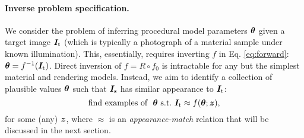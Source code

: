 \paragraph{Inverse problem specification.}
We consider the problem of inferring procedural model parameters $\bm\theta$ given a target image $\bm{I}_\mathrm{t}$  (which is typically a photograph of a material sample under known illumination).
This, essentially, requires inverting $f$ in Eq. \eqref{eq:forward}: $\bm\theta = f^{-1}(\bm{I}_\mathrm{t})$. Direct inversion of $f = R \circ f_0$ is intractable for any but the simplest material and rendering models.
Instead, we aim to identify a collection of plausible values $\bm\theta$ such that $\bm{I}_\mathrm{s}$ has similar appearance to $\bm{I}_\mathrm{t}$:
\begin{equation}
	\label{eq:approx}
	\mbox{find examples of } \ \bm\theta \ \mbox{s.t.} \ \bm{I}_\mathrm{t} \approx f(\bm\theta; \bm{z}),
\end{equation}
for some (any) $\bm{z}$, where $\approx$ is an \emph{appearance-match} relation that will be discussed in the next section.
